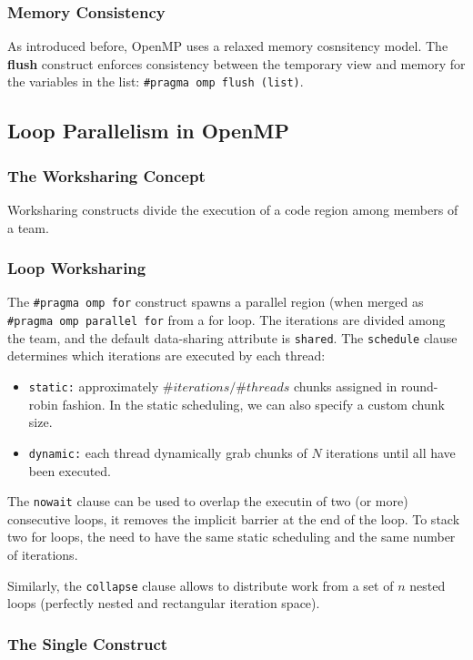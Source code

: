 \subsubsection{Memory Consistency}

As introduced before, OpenMP uses a relaxed memory cosnsitency model.
The \textbf{flush} construct enforces consistency between the temporary view and memory for the variables in the list: \texttt{\#pragma omp flush (list)}.

\subsection{Loop Parallelism in OpenMP}

\subsubsection{The Worksharing Concept}
Worksharing constructs divide the execution of a code region among members of a team.

\subsubsection{Loop Worksharing}
The \texttt{\#pragma omp for} construct spawns a parallel region (when merged as \texttt{\#pragma omp parallel for} from a for loop.
The iterations are divided among the team, and the default data-sharing attribute is \texttt{shared}.
The \texttt{schedule} clause determines which iterations are executed by each thread:
\begin{itemize}
    \item \texttt{static:} approximately $\#iterations / \#threads$ chunks assigned in round-robin fashion. In the static scheduling, we can also specify a custom chunk size.
    \item \texttt{dynamic:} each thread dynamically grab chunks of $N$ iterations until all have been executed.
\end{itemize}

The \texttt{nowait} clause can be used to overlap the executin of two (or more) consecutive loops, it removes the implicit barrier at the end of the loop.
To stack two for loops, the need to have the same static scheduling and the same number of iterations.

Similarly, the \texttt{collapse} clause allows to distribute work from a set of $n$ nested loops (perfectly nested and rectangular iteration space).

\subsubsection{The Single Construct}

